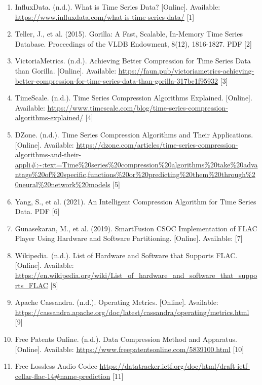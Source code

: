 \documentclass[conference]{IEEEtran}
\begin{document}
\begin{enumerate}
    \item InfluxData. (n.d.). What is Time Series Data? [Online]. Available: \url{https://www.influxdata.com/what-is-time-series-data/} [1]

    \item Teller, J., et al. (2015). Gorilla: A Fast, Scalable, In-Memory Time Series Database. Proceedings of the VLDB Endowment, 8(12), 1816-1827. PDF [2]

    \item VictoriaMetrics. (n.d.). Achieving Better Compression for Time Series Data than Gorilla. [Online]. Available: \href{https://faun.pub/victoriametrics-achieving-better-compression-for-time-series-data-than-gorilla-317bc1f95932}{https://faun.pub/victoriametrics-achieving-better-compression-for-time-series-data-than-gorilla-317bc1f95932} [3]

    \item TimeScale. (n.d.). Time Series Compression Algorithms Explained. [Online]. Available: \url{https://www.timescale.com/blog/time-series-compression-algorithms-explained/} [4]

    \item DZone. (n.d.). Time Series Compression Algorithms and Their Applications. [Online]. Available: \url{https://dzone.com/articles/time-series-compression-algorithms-and-their-appli#:~:text=Time%20series%20compression%20algorithms%20take%20advantage%20of%20specific,functions%20or%20predicting%20them%20through%20neural%20network%20models} [5]

    \item Yang, S., et al. (2021). An Intelligent Compression Algorithm for Time Series Data. PDF [6]

    \item Gunasekaran, M., et al. (2019). SmartFusion CSOC Implementation of FLAC Player Using Hardware and Software Partitioning. [Online]. Available: \href{https://www.microsemi.com/document-portal/doc_view/129825-ac376-smartfusion-csoc-implementation-of-flac-player-using-hardware-and-software-partitioning-app-note} [7]

    \item Wikipedia. (n.d.). List of Hardware and Software that Supports FLAC. [Online]. Available: \url{https://en.wikipedia.org/wiki/List_of_hardware_and_software_that_supports_FLAC} [8]

    \item Apache Cassandra. (n.d.). Operating Metrics. [Online]. Available: \url{https://cassandra.apache.org/doc/latest/cassandra/operating/metrics.html} [9]

    \item Free Patents Online. (n.d.). Data Compression Method and Apparatus. [Online]. Available: \url{https://www.freepatentsonline.com/5839100.html} [10]

    \item Free Lossless Audio Codec \url{https://datatracker.ietf.org/doc/html/draft-ietf-cellar-flac-14#name-prediction} [11]
\end{enumerate}
\end{document}
